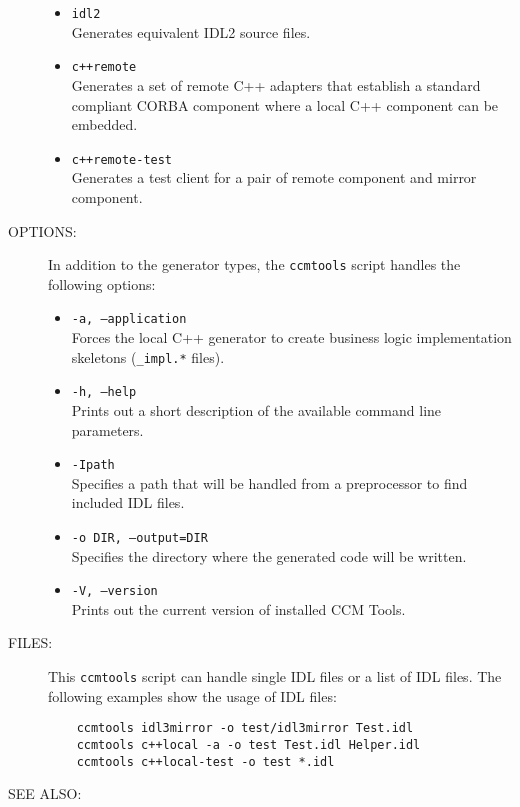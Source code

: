 \begin{description}
\begin{itemize}
  \item {\tt idl2} \\
    Generates equivalent IDL2 source files.

  \item {\tt c++remote} \\ 
    Generates a set of remote C++ adapters that establish a standard
    compliant CORBA component where a local C++ component can be embedded.

  \item {\tt c++remote-test}\\
    Generates a test client for a pair of remote component and mirror component.
  \end{itemize}
  
\item [OPTIONS:]
  In addition to the generator types, the {\tt ccmtools} script handles
  the following options:
  \begin{itemize}
  \item {\tt -a, --application} \\
    Forces the local C++ generator to create business logic
    implementation skeletons ({\tt *\_impl.*} files).

  \item {\tt -h, --help} \\
    Prints out a short description of the available command line parameters.

  \item {\tt -Ipath} \\
    Specifies a path that will be handled from a preprocessor to find 
    included IDL files.

  \item {\tt -o DIR, --output=DIR} \\
    Specifies the directory where the generated code will be written. 

  \item {\tt -V, --version} \\
    Prints out the current version of installed CCM Tools.
  \end{itemize}
  
\item [FILES:]
  This {\tt ccmtools} script can handle single IDL files or a list of IDL
  files. The following examples show the usage of IDL files: 
  \begin{verbatim}
    ccmtools idl3mirror -o test/idl3mirror Test.idl
    ccmtools c++local -a -o test Test.idl Helper.idl 
    ccmtools c++local-test -o test *.idl
  \end{verbatim}
\item [SEE ALSO:]
\end{description}


